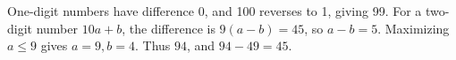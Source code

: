 One-digit numbers have difference 0, and 100 reverses to 1, giving 99. For a two-digit number $10a+b$, the difference is $9(a-b)=45$, so $a-b=5$. Maximizing $a\le9$ gives $a=9,b=4$. Thus $\boxed{94}$, and $94-49=45$.

